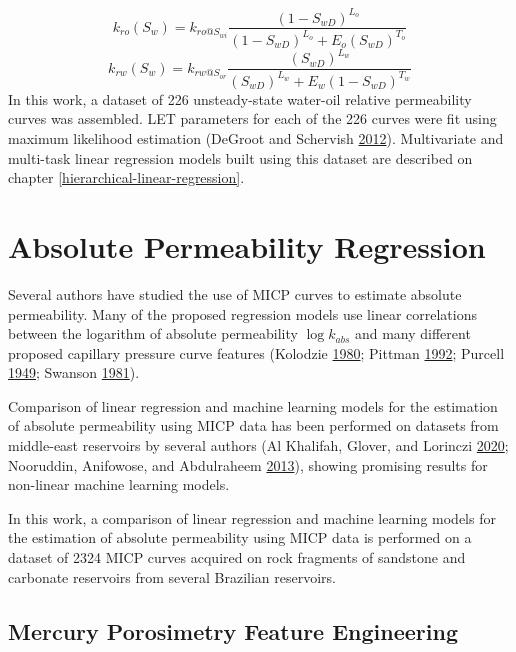 \documentclass[english,msc,numbers]{coppe}
\begin{document}
  \begin{equation} 
    k_{ro}(S_w) = k_{ro@S_{wi}}\frac{(1-S_{wD})^{L_o}}{(1-S_{wD})^{L_o} + E_o(S_{wD})^{T_o}}
    \label{eq:kro-let}
  \end{equation}
  \begin{equation} 
    k_{rw}(S_w) = k_{rw@S_{or}}\frac{(S_{wD})^{L_w}}{(S_{wD})^{L_w} + E_w(1-S_{wD})^{T_w}}
    \label{eq:krw-let}
  \end{equation}
  In this work, a dataset of 226 unsteady-state water-oil relative permeability curves was assembled. LET parameters for each of the 226 curves were fit using maximum likelihood estimation (DeGroot and Schervish \protect\hyperlink{ref-DeGroot2012}{2012}). Multivariate and multi-task linear regression models built using this dataset are described on chapter \ref{hierarchical-linear-regression}.
  
  \hypertarget{kabs-regression}{%
  \chapter{Absolute Permeability Regression}\label{kabs-regression}}
  
  Several authors have studied the use of MICP curves to estimate absolute permeability. Many of the proposed regression models use linear correlations between the logarithm of absolute permeability \(\log{k_{abs}}\) and many different proposed capillary pressure curve features (Kolodzie \protect\hyperlink{ref-Kolodzie1980}{1980}; Pittman \protect\hyperlink{ref-Pittman1992}{1992}; Purcell \protect\hyperlink{ref-Purcell1949}{1949}; Swanson \protect\hyperlink{ref-Swanson1981}{1981}).
  
  Comparison of linear regression and machine learning models for the estimation of absolute permeability using MICP data has been performed on datasets from middle-east reservoirs by several authors (Al Khalifah, Glover, and Lorinczi \protect\hyperlink{ref-AlKhalifah2020}{2020}; Nooruddin, Anifowose, and Abdulraheem \protect\hyperlink{ref-Nooruddin2013}{2013}), showing promising results for non-linear machine learning models.
  
  In this work, a comparison of linear regression and machine learning models for the estimation of absolute permeability using MICP data is performed on a dataset of 2324 MICP curves acquired on rock fragments of sandstone and carbonate reservoirs from several Brazilian reservoirs.
  
  \hypertarget{pchg-feat-eng}{%
  \section{Mercury Porosimetry Feature Engineering}\label{pchg-feat-eng}}
  
\end{document}
